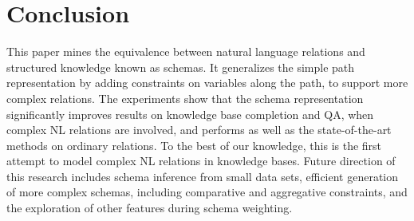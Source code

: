 \section{Conclusion}
This paper mines the equivalence between natural language relations
and structured knowledge known as schemas. It generalizes
the simple path representation by adding constraints on variables
along the path, to support more complex relations.
The experiments show that the schema representation
significantly improves results on knowledge base completion and QA,
when complex NL relations are involved, and performs as well as the
state-of-the-art methods on ordinary relations.
To the best of our knowledge, this is the first attempt
to model complex NL relations in knowledge bases.
Future direction of this research includes schema inference from
small data sets, efficient generation of
more complex schemas, including comparative and aggregative constraints, 
and the exploration of other features during
schema weighting.

